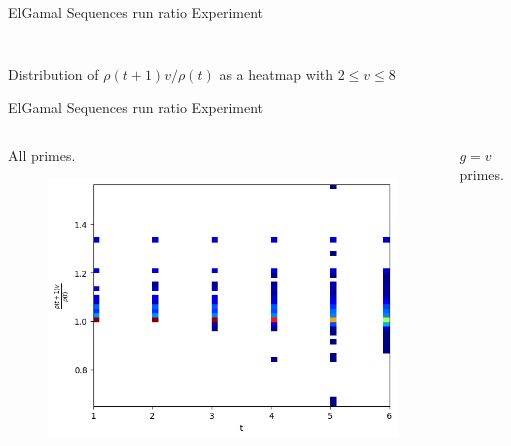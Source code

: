 \begin{frame}{ElGamal Sequences run ratio Experiment}
\begin{columns}
\begin{column}{0.45\textwidth}
\begin{figure}
            \end{figure}
        \end{column}
    \end{columns}
    \begin{center}
                Distribution of $\rho(t+1)v/\rho(t)$ as a heatmap with $2 \leq v \leq 8$
    \end{center}
\end{frame}

\begin{frame}{ElGamal Sequences run ratio Experiment}
    \begin{columns}
        \begin{column}{0.45\textwidth}
        \begin{center}
            All primes.
        \end{center}
            \begin{figure}
                \centering
                \includegraphics[width=\textwidth]{figures/v2Normalizedrunratio.png}
            \end{figure}
        \end{column}
        \begin{column}{0.45\textwidth}
        \begin{center}
            $g = v$ primes.
        \end{center}
            \begin{figure}
                \centering

\end{figure}
\end{column}
\end{columns}
\end{frame}
